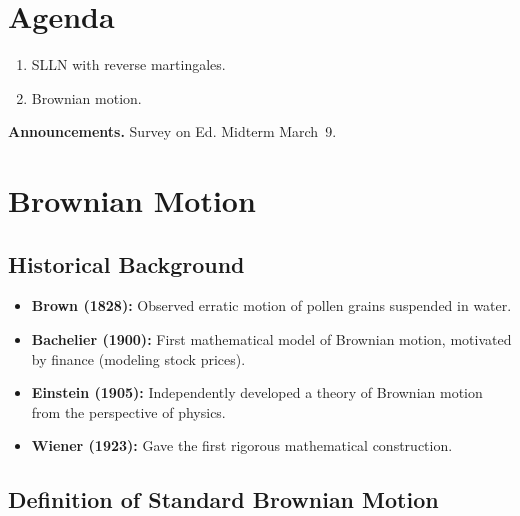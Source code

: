 
\section*{Agenda}
\begin{enumerate}
    \item SLLN with reverse martingales.
    \item Brownian motion.
\end{enumerate}

\noindent\textbf{Announcements.} Survey on Ed. Midterm March~9.

\section{Brownian Motion}

\subsection{Historical Background}

\begin{itemize}
    \item \textbf{Brown (1828):} Observed erratic motion of pollen grains suspended in water.
    \item \textbf{Bachelier (1900):} First mathematical model of Brownian motion, motivated by finance (modeling stock prices).
    \item \textbf{Einstein (1905):} Independently developed a theory of Brownian motion from the perspective of physics.
    \item \textbf{Wiener (1923):} Gave the first rigorous mathematical construction.
\end{itemize}

\subsection{Definition of Standard Brownian Motion}

